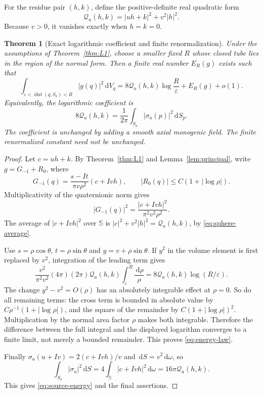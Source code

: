 \documentclass[11pt,a4paper]{article}
\numberwithin{equation}{section}
\newtheorem{theorem}{Theorem}[section]
\theoremstyle{definition}
\theoremstyle{remark}
\newcommand{\SSS}{\mathbb S}
\newcommand{\dd}{\,\mathrm d}
\newcommand{\dist}{\operatorname{dist}}
\begin{document}
For the residue pair $(h,k)$, define the positive-definite real quadratic
form
\begin{equation}\label{eq:quadratic}
 \mathcal Q_a(h,k)=|uh+k|^2+v^2|h|^2.
\end{equation}
Because $v>0$, it vanishes exactly when $h=k=0$.

\begin{theorem}[Exact logarithmic coefficient and finite renormalization]
\label{thm:energy}
Under the assumptions of Theorem~\ref{thm:L1}, choose a smaller fixed
$R$ whose closed tube lies in the region of the normal form. Then a
finite real number $E_R(g)$ exists such that
\begin{equation}\label{eq:energy-law}
 \boxed{\
 \int_{\varepsilon<\dist(q,S_a)<R}|g(q)|^2\dd V_q
 =8\mathcal Q_a(h,k)\log\frac R\varepsilon+E_R(g)+o(1).
 \ }
\end{equation}
Equivalently, the logarithmic coefficient is
\begin{equation}\label{eq:source-energy}
 8\mathcal Q_a(h,k)
       =\frac1{2\pi}\int_{S_a}|\sigma_a(p)|^2\dd S_p.
\end{equation}
The coefficient is unchanged by adding a smooth axial monogenic field.
The finite renormalized constant need not be unchanged.
\end{theorem}
\begin{proof}
Let $c=uh+k$. By Theorem~\ref{thm:L1} and
Lemma~\ref{lem:principal}, write $g=G_{-1}+R_0$, where
\[
 G_{-1}(q)=\frac{s-It}{\pi v\rho^2}(c+Ivh),\qquad
 |R_0(q)|\le C(1+|\log\rho|).
\]
Multiplicativity of the quaternionic norm gives
\[
 |G_{-1}(q)|^2=\frac{|c+Ivh|^2}{\pi^2v^2\rho^2}.
\]
The average of $|c+Ivh|^2$ over $\SSS$ is
$|c|^2+v^2|h|^2=\mathcal Q_a(h,k)$, by
\eqref{eq:sphere-average}.

Use $s=\rho\cos\theta$, $t=\rho\sin\theta$ and
$y=v+\rho\sin\theta$. If $y^2$ in the volume element is first replaced
by $v^2$, integration of the leading term gives
\[
 \frac{v^2}{\pi^2v^2}(4\pi)(2\pi)\mathcal Q_a(h,k)
             \int_\varepsilon^R\frac{\dd\rho}{\rho}
 =8\mathcal Q_a(h,k)\log(R/\varepsilon).
\]
The change $y^2-v^2=O(\rho)$ has an absolutely integrable effect at
$\rho=0$. So do all remaining terms: the cross term is bounded in
absolute value by
$C\rho^{-1}(1+|\log\rho|)$, and the square of the remainder by
$C(1+|\log\rho|)^2$. Multiplication by the normal area factor $\rho$
makes both integrable. Therefore the difference between the full
integral and the displayed logarithm converges to a finite limit,
not merely a bounded remainder. This proves \eqref{eq:energy-law}.

Finally $\sigma_a(u+Iv)=2(c+Ivh)/v$ and
$\dd S=v^2\dd\omega$, so
\[
 \int_{S_a}|\sigma_a|^2\dd S
 =4\int_{\SSS}|c+Ivh|^2\dd\omega
 =16\pi\mathcal Q_a(h,k).
\]
This gives \eqref{eq:source-energy} and the final assertions.
\end{proof}
\end{document}
